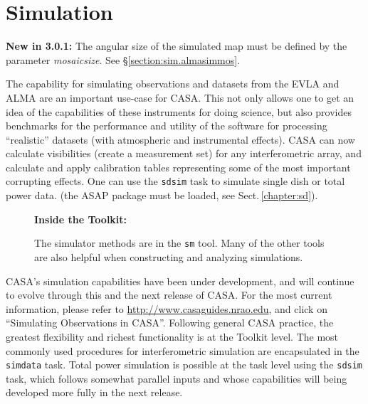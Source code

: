
\chapter[Appendix: Simulation]{Simulation}
\label{chapter:sim}

{\bfseries New in 3.0.1:} The angular size of the simulated map must
be defined by the parameter {\em mosaicsize}.  See
\S\ref{section:sim.almasimmos}.

The capability for simulating observations and datasets from the EVLA
and ALMA are an important use-case for CASA.  This not only allows one
to get an idea of the capabilities of these instruments for doing
science, but also provides benchmarks for the performance and utility
of the software for processing ``realistic'' datasets (with
atmospheric and instrumental effects).  CASA can now calculate
visibilities (create a measurement set) for any interferometric array,
and calculate and apply calibration tables representing some of the
most important corrupting effects.  One can use the {\tt sdsim} task
to simulate single dish or total power data.  (the ASAP package must
be loaded, see Sect.\,\ref{chapter:sd}).

\begin{wrapfigure}{r}{2.5in}
 \begin{boxedminipage}{2.5in}
    \centerline{\bf Inside the Toolkit:}
    The simulator methods are in the {\tt sm} tool.
    Many of the other tools are also helpful when
    constructing and analyzing simulations.
 \end{boxedminipage}
\end{wrapfigure}

CASA's simulation capabilities have been under development, and will
continue to evolve through this and the next release of CASA.
For the most current information, please refer to
\url{http://www.casaguides.nrao.edu}, and click on ``Simulating
Observations in CASA''.
%
Following general CASA practice, the greatest flexibility and richest
functionality is at the Toolkit level.  The most commonly used
procedures for interferometric simulation are encapsulated in the {\tt
 simdata} task.  Total power simulation is possible at the task level
using the {\tt sdsim} task, which follows somewhat parallel inputs
and whose capabilities will being developed more fully in the next
release.

